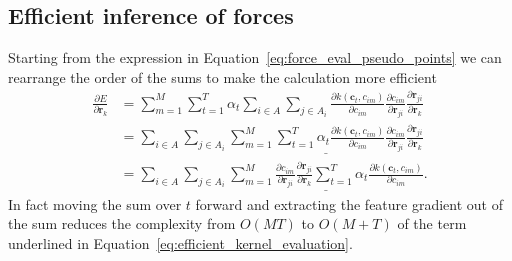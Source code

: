 \subsection{Efficient inference of forces}
Starting from the expression in Equation~\eqref{eq:force_eval_pseudo_points} we can rearrange the order of the sums to make the calculation more efficient
\begin{subequations}
  \label{eq:efficient_kernel_evaluation}
\begin{align}
  \frac{\partial E}{\partial \mathbf{r}_k} &= \sum_{m=1}^M\sum_{t=1}^T \alpha_t \sum_{i\in A}\sum_{j\in A_i} \frac{\partial k(\mathbf{c}_{t}, c_{im})}{\partial c_{im}} \frac{\partial c_{im}}{\partial\mathbf{r}_{ji}} \frac{\partial\mathbf{r}_{ji}}{\partial\mathbf{r}_k}\\
  &= \sum_{i\in A}\sum_{j\in A_i} \underline{\sum_{m=1}^M\sum_{t=1}^T \alpha_t \frac{\partial k(\mathbf{c}_{t}, c_{im})}{\partial c_{im}} \frac{\partial c_{im}}{\partial\mathbf{r}_{ji}} \frac{\partial\mathbf{r}_{ji}}{\partial\mathbf{r}_k}}\\
  &= \sum_{i\in A}\sum_{j\in A_i}\underline{\sum_{m=1}^M\frac{\partial c_{im}}{\partial\mathbf{r}_{ji}} \frac{\partial\mathbf{r}_{ji}}{\partial\mathbf{r}_k} \sum_{t=1}^T \alpha_t \frac{\partial k(\mathbf{c}_{t}, c_{im})}{\partial c_{im}}}.
  \label{eq:efficient_kernel_evaluation-c}
\end{align}
\end{subequations}
In fact moving the sum over $t$ forward and extracting the feature gradient out of the sum reduces the complexity from $O(MT)$ to $O(M+T)$ of the term underlined in Equation~\eqref{eq:efficient_kernel_evaluation}.

